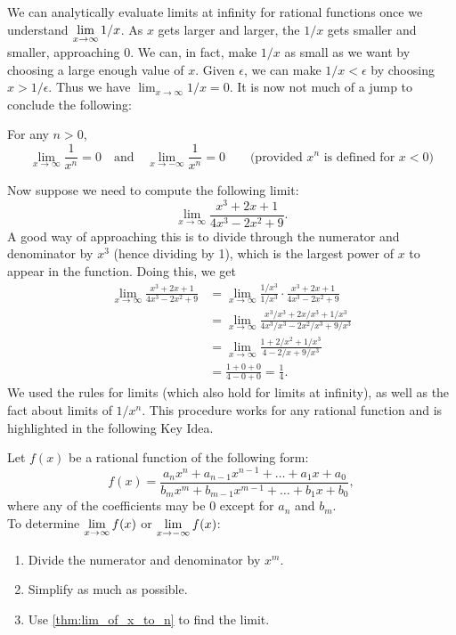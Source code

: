 
We can analytically evaluate limits at infinity for rational functions once we understand $\displaystyle\lim_{x\rightarrow\infty} 1/x$.  As $x$ gets larger and larger, the $1/x$ gets smaller and smaller, approaching 0.  We can, in fact, make $1/x$ as small as we want by choosing a large enough value of $x$.  Given $\epsilon$, we can make $1/x<\epsilon$  by choosing $x>1/\epsilon$.  Thus we have $\lim_{x\rightarrow\infty} 1/x=0$.  
It is now not much of a jump to conclude the following:

{
\begin{theorem}\label{thm:lim_of_x_to_n}%
For any $n>0$, 
\[
\lim_{x\to\infty}\frac{1}{x^n}=0
\quad\text{and}\quad
\lim_{x\to-\infty}\frac{1}{x^n}=0
\qquad\text{(provided $x^n$ is defined for $x<0$)}
\]
\end{theorem}}


Now suppose we need to compute the following limit:
\[\lim_{x\rightarrow\infty}\frac{x^3+2x+1}{4x^3-2x^2+9}.\]
A good way of approaching this is to divide through the numerator and denominator by $x^3$ (hence dividing by 1), which is the largest power of $x$ to appear in the function.  Doing this, we get
\begin{align*}
\lim_{x\to\infty}\frac{x^3+2x+1}{4x^3-2x^2+9} &=
\lim_{x\to\infty}\frac{1/x^3}{1/x^3}\cdot\frac{x^3+2x+1}{4x^3-2x^2+9}\\ &=\lim_{x\to\infty}\frac{x^3/x^3+2x/x^3+1/x^3}{4x^3/x^3-2x^2/x^3+9/x^3}\\ &= \lim_{x\to\infty}\frac{1+2/x^2+1/x^3}{4-2/x+9/x^3}\\
&=\frac{1+0+0}{4-0+0}=\frac14.
\end{align*}
We used the rules for limits (which also hold for limits at infinity), as well as the fact about limits of $1/x^n$. This procedure works for any rational function and is highlighted in the following Key Idea.

\begin{keyidea}\label{key:rat_lim_at_inf}%
Let $f(x)$ be a rational function of the following form:
\[
f(x)
=\frac{a_nx^n + a_{n-1}x^{n-1}+\dots + a_1x + a_0}
{b_mx^m + b_{m-1}x^{m-1} + \dots + b_1x + b_0},
\]
where any of the coefficients may be 0 except for $a_n$ and $b_m$.\\
To determine $\displaystyle\lim_{x\to \infty}f(x)$ or $\displaystyle\lim_{x\to-\infty}f(x)$:
\begin{enumerate}
\item Divide the numerator and denominator by $x^m$.
\item Simplify as much as possible.
\item Use \autoref{thm:lim_of_x_to_n} to find the limit.
\end{enumerate}
\end{keyidea}

